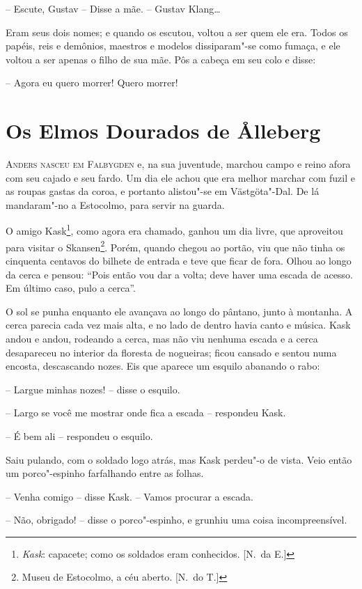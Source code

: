 -- Escute, Gustav -- Disse a mãe. -- Gustav Klang\ldots{}

Eram seus dois nomes; e quando os escutou, voltou a ser quem ele era.
Todos os papéis, reis e demônios, maestros e modelos dissiparam"-se
como fumaça, e ele voltou a ser apenas o filho de sua mãe. Pôs a cabeça
em seu colo e disse:

-- Agora eu quero morrer! Quero morrer!

\chapter[Os Elmos Dourados de \r Alleberg]{Os Elmos Dourados de \r Alleberg} 


\textsc{Anders nasceu em Falbygden} e, na sua juventude, marchou campo e reino
afora com seu cajado e seu fardo. Um dia ele achou que era melhor
marchar com fuzil e as roupas gastas da coroa, e portanto alistou"-se
em Västgöta"-Dal. De lá mandaram"-no a Estocolmo, para servir na guarda.

O amigo Kask\footnote{ \textit{Kask}: capacete; como os soldados eram
conhecidos. [N.~da E.]}, como agora era chamado, ganhou um dia livre, que
aproveitou para visitar o Skansen\footnote{ Museu de Estocolmo, a céu
aberto. [N.~do T.]}. Porém, quando chegou ao portão, viu que não tinha os
cinquenta centavos do bilhete de entrada e teve que ficar de fora.
Olhou ao longo da cerca e pensou: ``Pois então vou dar a volta; deve
haver uma escada de acesso. Em último caso, pulo a cerca''.

O sol se punha enquanto ele avançava ao longo do pântano, junto à
montanha. A cerca parecia cada vez mais alta, e no lado de dentro havia
canto e música. Kask andou e andou, rodeando a cerca, mas não viu
nenhuma escada e a cerca desapareceu no interior da floresta de
nogueiras; ficou cansado e sentou numa encosta, descascando nozes. Eis
que aparece um esquilo abanando o rabo:

-- Largue minhas nozes! -- disse o esquilo.

-- Largo se você me mostrar onde fica a escada -- respondeu Kask.

-- É bem ali -- respondeu o esquilo.

Saiu pulando, com o soldado logo atrás, mas Kask perdeu"-o de vista.
Veio então um porco"-espinho farfalhando entre as folhas.

-- Venha comigo -- disse Kask. -- Vamos procurar a escada.

-- Não, obrigado! -- disse o porco"-espinho, e grunhiu uma coisa
incompreensível.

